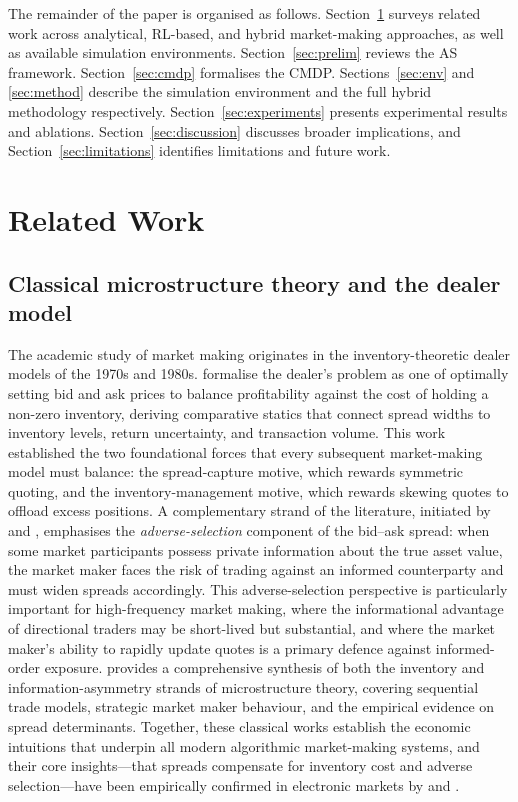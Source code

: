 \documentclass[11pt]{article}
\begin{document}
The remainder of the paper is organised as follows.
Section~\ref{sec:related} surveys related work across analytical,
RL-based, and hybrid market-making approaches, as well as available
simulation environments.
Section~\ref{sec:prelim} reviews the AS framework.
Section~\ref{sec:cmdp} formalises the CMDP.
Sections~\ref{sec:env} and \ref{sec:method} describe the simulation
environment and the full hybrid methodology respectively.
Section~\ref{sec:experiments} presents experimental results and ablations.
Section~\ref{sec:discussion} discusses broader implications, and
Section~\ref{sec:limitations} identifies limitations and future work.

\section{Related Work}
\label{sec:related}

\subsection{Classical microstructure theory and the dealer model}

The academic study of market making originates in the inventory-theoretic
dealer models of the 1970s and 1980s.
\textcite{ho1981dealer} formalise the dealer's problem as one of optimally
setting bid and ask prices to balance profitability against the cost of
holding a non-zero inventory, deriving comparative statics that connect
spread widths to inventory levels, return uncertainty, and transaction
volume.
This work established the two foundational forces that every subsequent
market-making model must balance: the spread-capture motive, which
rewards symmetric quoting, and the inventory-management motive, which
rewards skewing quotes to offload excess positions.
A complementary strand of the literature, initiated by
\textcite{glosten1985bid} and \textcite{kyle1985continuous}, emphasises
the \emph{adverse-selection} component of the bid--ask spread: when some
market participants possess private information about the true asset
value, the market maker faces the risk of trading against an informed
counterparty and must widen spreads accordingly.
This adverse-selection perspective is particularly important for
high-frequency market making, where the informational advantage of
directional traders may be short-lived but substantial, and where the
market maker's ability to rapidly update quotes is a primary defence
against informed-order exposure.
\textcite{ohara1995microstructure} provides a comprehensive synthesis of
both the inventory and information-asymmetry strands of microstructure
theory, covering sequential trade models, strategic market maker
behaviour, and the empirical evidence on spread determinants.
Together, these classical works establish the economic intuitions that
underpin all modern algorithmic market-making systems, and their core
insights---that spreads compensate for inventory cost and adverse
selection---have been empirically confirmed in electronic markets by
\textcite{hendershott2011does} and \textcite{menkveld2013high}.
\end{document}
